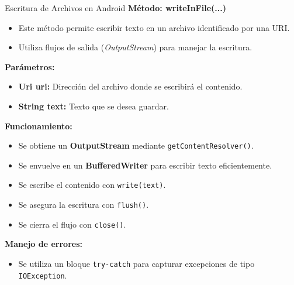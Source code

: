 \begin{frame}{Escritura de Archivos en Android}
\textbf{Método: writeInFile(...)}

\begin{itemize}
    \item Este método permite escribir texto en un archivo identificado por una URI.
    \item Utiliza flujos de salida (\textit{OutputStream}) para manejar la escritura.
\end{itemize}


\textbf{Parámetros:}
\begin{itemize}
    \item \textbf{Uri uri:} Dirección del archivo donde se escribirá el contenido.
    \item \textbf{String text:} Texto que se desea guardar.
\end{itemize}


\textbf{Funcionamiento:}
\begin{itemize}
    \item Se obtiene un \textbf{OutputStream} mediante \texttt{getContentResolver()}.
    \item Se envuelve en un \textbf{BufferedWriter} para escribir texto eficientemente.
    \item Se escribe el contenido con \texttt{write(text)}.
    \item Se asegura la escritura con \texttt{flush()}.
    \item Se cierra el flujo con \texttt{close()}.
\end{itemize}


\textbf{Manejo de errores:}
\begin{itemize}
    \item Se utiliza un bloque \texttt{try-catch} para capturar excepciones de tipo \texttt{IOException}.
\end{itemize}


\end{frame}


